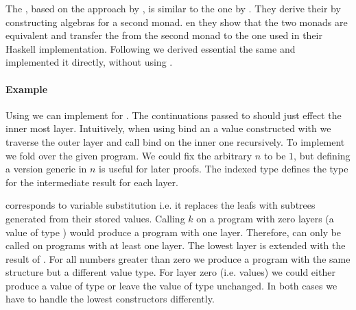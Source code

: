 The , based on the approach by
\textcite{DBLP:journals/corr/abs-1806-05230}, is similar to the one by
\textcite{DBLP:conf/lics/PirogSWJ18}.
They derive their  by constructing algebras for a
second monad.
en  they show that the two monads are
equivalent and transfer the  from the
second monad to the one used in their Haskell implementation.
Following \textcite{DBLP:journals/corr/abs-1806-05230} we derived essential the
same  and implemented it directly, without using
\AgdaFunction{>>=}.

\paragraph{Example}
Using  we can implement \AgdaFunction{>>=} for
\AgdaSpace{}\AgdaSpace{}.
The continuations  passed to \AgdaFunction{>>=} should just
effect the inner most layer.
Intuitively, when using bind an a value constructed with
 we traverse the outer layer and call bind on the
inner one recursively.
To implement \AgdaFunction{>>=} we fold over the given program.
We could fix the arbitrary $n$ to be $1$, but defining a version generic in $n$
is useful for later proofs.
The  indexed type  defines the type for the
intermediate result for each layer.

\AgdaFunction{>>=} corresponds to variable substitution i.e. it replaces the
 leafs with subtrees generated from their stored
values.
Calling $k$ on a program with zero layers (a value of type )
would produce a program with one layer.
Therefore, \bind{} can only be called on programs with at least one layer.
The lowest layer is extended with the result of .
For all numbers greater than zero we produce a program with the same structure
but a different value type.
For layer zero (i.e. values) we could either produce a value of type 
\AgdaSpace{}\AgdaSpace{}
or leave the value of type  unchanged.
In both cases we have to handle the lowest 
constructors differently.

